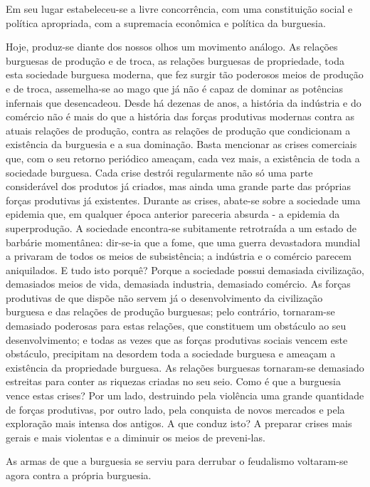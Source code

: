 Em seu lugar estabeleceu-se a livre concorrência, com uma constituição
social e política apropriada, com a supremacia econômica e política da
burguesia.

Hoje, produz-se diante dos nossos olhos um movimento análogo. As
relações burguesas de produção e de troca, as relações burguesas de
propriedade, toda esta sociedade burguesa moderna, que fez surgir tão
poderosos meios de produção e de troca, assemelha-se ao mago que já
não é capaz de dominar as potências infernais que desencadeou. Desde
há dezenas de anos, a história da indústria e do comércio não é mais
do que a história das forças produtivas modernas contra as atuais
relações de produção, contra as relações de produção que condicionam a
existência da burguesia e a sua dominação. Basta mencionar as crises
comerciais que, com o seu retorno periódico ameaçam, cada vez mais, a
existência de toda a sociedade burguesa. Cada crise destrói
regularmente não só uma parte considerável dos produtos já criados,
mas ainda uma grande parte das próprias forças produtivas já
existentes. Durante as crises, abate-se sobre a sociedade uma epidemia
que, em qualquer época anterior pareceria absurda - a epidemia da
superprodução. A sociedade encontra-se subitamente retrotraída a um
estado de barbárie momentânea: dir-se-ia que a fome, que uma guerra
devastadora mundial a privaram de todos os meios de subsistência; a
indústria e o comércio parecem aniquilados. E tudo isto porquê? Porque
a sociedade possui demasiada civilização, demasiados meios de vida,
demasiada industria, demasiado comércio. As forças produtivas de que
dispõe não servem já o desenvolvimento da civilização burguesa e das
relações de produção burguesas; pelo contrário, tornaram-se demasiado
poderosas para estas relações, que constituem um obstáculo ao seu
desenvolvimento; e todas as vezes que as forças produtivas sociais
vencem este obstáculo, precipitam na desordem toda a sociedade
burguesa e ameaçam a existência da propriedade burguesa. As relações
burguesas tornaram-se demasiado estreitas para conter as riquezas
criadas no seu seio. Como é que a burguesia vence estas crises? Por um
lado, destruindo pela violência uma grande quantidade de forças
produtivas, por outro lado, pela conquista de novos mercados e pela
exploração mais intensa dos antigos. A que conduz isto? A preparar
crises mais gerais e mais violentas e a diminuir os meios de
preveni-las.

As armas de que a burguesia se serviu para derrubar o feudalismo
voltaram-se agora contra a própria burguesia.

